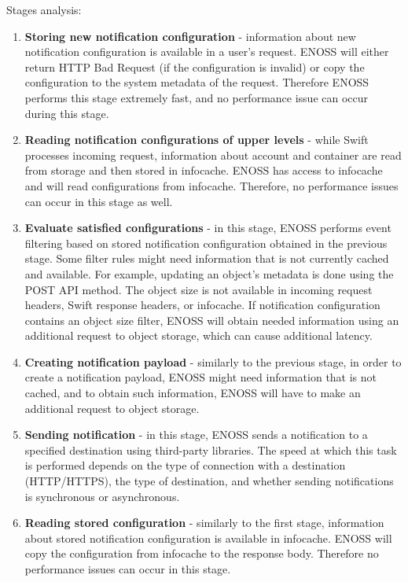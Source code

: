     Stages analysis:

    \begin{enumerate}
        \item \textbf{Storing new notification configuration} - information about new notification configuration is available in a user's request. ENOSS will either return HTTP Bad Request (if the configuration is invalid) or copy the configuration to the system metadata of the request. Therefore ENOSS performs this stage extremely fast, and no performance issue can occur during this stage.
        \item \textbf{Reading notification configurations of upper levels} - while Swift processes incoming request, information about account and container are read from storage and then stored in infocache. ENOSS has access to infocache and will read configurations from infocache. Therefore, no performance issues can occur in this stage as well.
        \item \textbf{Evaluate satisfied configurations} - in this stage, ENOSS performs event filtering based on stored notification configuration obtained in the previous stage. Some filter rules might need information that is not currently cached and available. For example, updating an object's metadata is done using the POST API method. The object size is not available in incoming request headers, Swift response headers, or infocache. If notification configuration contains an object size filter, ENOSS will obtain needed information using an additional request to object storage, which can cause additional latency.
        \item \textbf{Creating notification payload} - similarly to the previous stage, in order to create a notification payload, ENOSS might need information that is not cached, and to obtain such information, ENOSS will have to make an additional request to object storage.
        \item \textbf{Sending notification} - in this stage, ENOSS sends a notification to a specified destination using third-party libraries. The speed at which this task is performed depends on the type of connection with a destination (HTTP/HTTPS), the type of destination, and whether sending notifications is synchronous or asynchronous.
        \item \textbf{Reading stored configuration} - similarly to the first stage, information about stored notification configuration is available in infocache. ENOSS will copy the configuration from infocache to the response body. Therefore no performance issues can occur in this stage.
    \end{enumerate}

